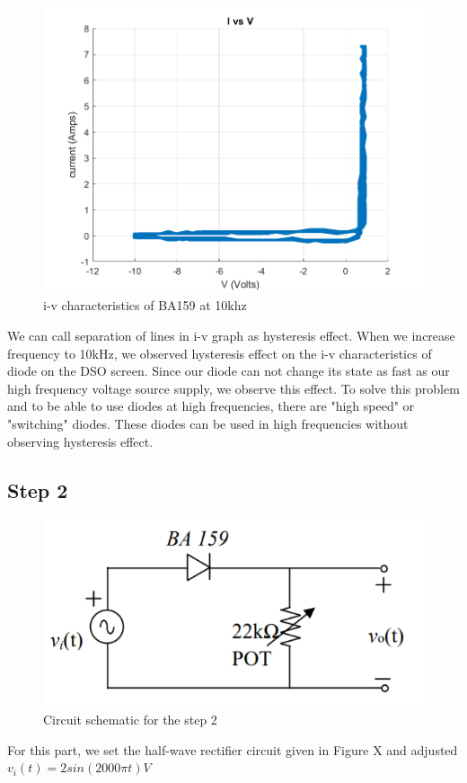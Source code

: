 \documentclass[letterpaper,12pt]{article}
\begin{document}
\begin{figure}[H]
    \centering
    \includegraphics[width=1\textwidth]{1_ba159_10khz.png}
    \caption{i-v characteristics of BA159 at 10khz}
\end{figure} 

We can call separation of lines in i-v graph as hysteresis effect. When we increase frequency to 10kHz, we observed hysteresis effect on the i-v characteristics of diode on the DSO screen. Since our diode can not change its state as fast as our high frequency voltage source supply, we observe this effect. To solve this problem and to be able to use diodes at high frequencies, there are "high speed" or "switching" diodes. These diodes can be used in high frequencies without observing hysteresis effect.

\subsection{Step 2}

\begin{figure}[H]
    \centering
    \includegraphics[width=1\textwidth]{2_1.png}
    \caption{Circuit schematic for the step 2}
\end{figure} 
For this part, we set the half-wave rectifier circuit given in Figure X and adjusted 
\(
v_i(t)  = 2sin(2000 \pi t) V 
\)
\end{document}
